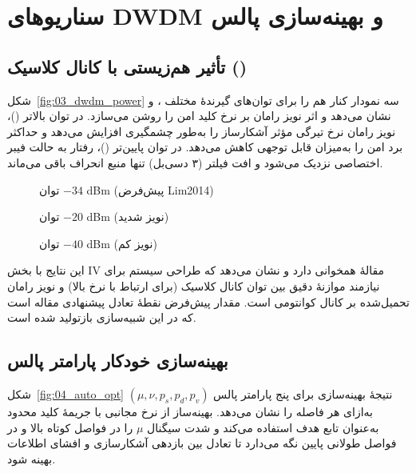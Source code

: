 \chapter{سناریوهای DWDM و بهینه‌سازی پالس}
\label{ch:results_dwdm_opt}

\section{تأثیر هم‌زیستی با کانال کلاسیک ()}
شکل~\ref{fig:03_dwdm_power} سه نمودار کنار هم را برای توان‌های گیرندهٔ مختلف ،  و  نشان می‌دهد و اثر نویز رامان بر نرخ کلید امن را روشن می‌سازد. در توان بالاتر ()، نویز رامان نرخ تیرگی مؤثر آشکارساز را به‌طور چشمگیری افزایش می‌دهد و حداکثر برد امن را به‌میزان قابل توجهی کاهش می‌دهد. در توان پایین‌تر ()، رفتار به حالت فیبر اختصاصی نزدیک می‌شود و افت فیلتر  (۳ دسی‌بل) تنها منبع انحراف باقی می‌ماند.


\begin{figure}[htbp]
	\centering
	\caption{توان $-34$ dBm (پیش‌فرض Lim2014)}
	\label{fig:03a_dwdm_default}
\end{figure}
\begin{figure}[htbp]
	\centering
	\caption{توان $-20$ dBm (نویز شدید)}
	\label{fig:03b_dwdm_high}
\end{figure}
\begin{figure}[htbp]
	\centering
	\caption{توان $-40$ dBm (نویز کم)}
	\label{fig:03c_dwdm_low}
\end{figure}


این نتایج با بخش IV مقالهٔ  همخوانی دارد و نشان می‌دهد که طراحی سیستم  برای  نیازمند موازنهٔ دقیق بین توان کانال کلاسیک (برای ارتباط با نرخ بالا) و نویز رامان تحمیل‌شده بر کانال کوانتومی است. مقدار پیش‌فرض  نقطهٔ تعادل پیشنهادی مقاله است که در این شبیه‌سازی بازتولید شده است.

\section{بهینه‌سازی خودکار پارامتر پالس}
شکل~\ref{fig:04_auto_opt} نتیجهٔ بهینه‌سازی  برای پنج پارامتر پالس $(\mu, \nu, p_s, p_d, p_v)$ به‌ازای هر فاصله را نشان می‌دهد. بهینه‌ساز از نرخ  مجانبی با جریمهٔ کلید محدود به‌عنوان تابع هدف استفاده می‌کند و شدت سیگنال $\mu$ را در فواصل کوتاه بالا و در فواصل طولانی پایین نگه می‌دارد تا تعادل بین بازدهی آشکارسازی و افشای اطلاعات بهینه شود.

